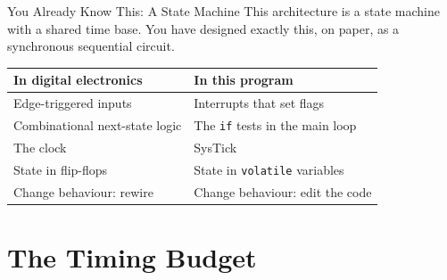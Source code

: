 \documentclass[9pt,aspectratio=169,xcolor=table]{beamer}
\begin{document}
\begin{frame}{You Already Know This: A State Machine}
    \leavevmode
    This architecture is a \alert{state machine with a shared time base}. You have designed exactly this, on paper, as a synchronous sequential circuit.

    \vspace{3mm}
    \begin{center}
    {\small
    \striped
    \begin{tabular}{@{}l l@{}}
        \toprule
        \textbf{In digital electronics} & \textbf{In this program} \\
        \midrule
        Edge-triggered inputs & Interrupts that set flags \\
        Combinational next-state logic & The \texttt{if} tests in the main loop \\
        The clock & SysTick \\
        State in flip-flops & State in \texttt{volatile} variables \\
        Change behaviour: rewire & Change behaviour: \alert{edit the code} \\
        \bottomrule
    \end{tabular}}
    \end{center}
\end{frame}


\section{The Timing Budget}
\end{document}
